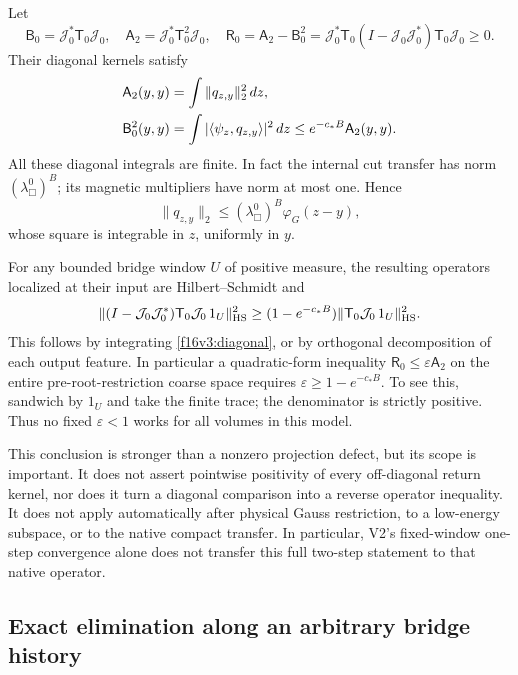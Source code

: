\documentclass[11pt,oneside]{article}
\begin{document}
Let
\[
 \mathsf B_0=\mathcal J_0^*\mathsf T_0\mathcal J_0,\quad
 \mathsf A_2=\mathcal J_0^*\mathsf T_0^2\mathcal J_0,\quad
 \mathsf R_0=\mathsf A_2-\mathsf B_0^2
 =\mathcal J_0^*\mathsf T_0(I-\mathcal J_0\mathcal J_0^*)
                              \mathsf T_0\mathcal J_0\ge0.
\]
Their diagonal kernels satisfy
\begin{align}
 \mathsf A_2(y,y)&=\int\|q_{z,y}\|_2^2\,dz,\notag\\
 \mathsf B_0^2(y,y)&=\int|\langle\psi_z,q_{z,y}\rangle|^2\,dz
                 \le e^{-c_*B}\mathsf A_2(y,y).
 \label{f16v3:diagonal}
\end{align}
All these diagonal integrals are finite. In fact the internal
cut transfer has norm \((\lambda_\Box^0)^B\); its magnetic
multipliers have norm at most one. Hence
\[
 \|q_{z,y}\|_2
       \le(\lambda_\Box^0)^B\varphi_G(z-y),
\]
whose square is integrable in \(z\), uniformly in \(y\).

For any bounded bridge window \(U\) of positive measure,
the resulting operators localized at their input are
Hilbert--Schmidt and
\begin{equation}
 \|(I-\mathcal J_0\mathcal J_0^*)\mathsf T_0
                      \mathcal J_0\,1_U\|_{\rm HS}^2
 \ge(1-e^{-c_*B})
              \|\mathsf T_0\mathcal J_0\,1_U\|_{\rm HS}^2.
 \label{f16v3:HS-loss}
\end{equation}
This follows by integrating \eqref{f16v3:diagonal}, or by
orthogonal decomposition of each output feature.
In particular a quadratic-form inequality
\(\mathsf R_0\le\varepsilon\mathsf A_2\) on the entire
pre-root-restriction coarse space requires
\(\varepsilon\ge1-e^{-c_*B}\). To see this, sandwich by \(1_U\)
and take the finite trace; the denominator is strictly positive.
Thus no fixed \(\varepsilon<1\) works for all volumes in this model.

This conclusion is stronger than a nonzero projection defect,
but its scope is important. It does not assert pointwise
positivity of every off-diagonal return kernel, nor does it
turn a diagonal comparison into a reverse operator inequality.
It does not apply automatically after physical Gauss
restriction, to a low-energy subspace, or to the native compact
transfer. In particular, V2's fixed-window one-step convergence
alone does not transfer this full two-step statement to that
native operator.

\subsection{Exact elimination along an arbitrary bridge history}
\end{document}
